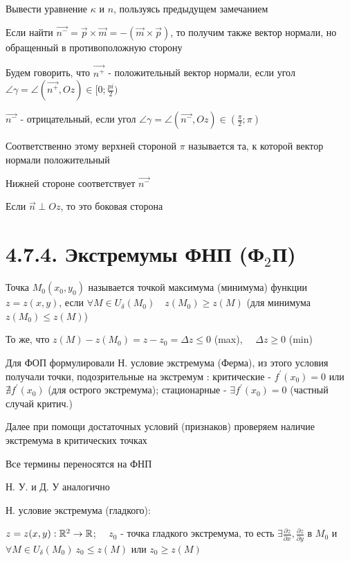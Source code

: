 \documentclass[12pt]{article}
\begin{document}
    \Lab Вывести уравнение $\kappa$ и $n$, пользуясь предыдущем замечанием

    \Nota Если найти $\overrightarrow{n^-} = \overrightarrow{p} \times \overrightarrow{m} = - (\overrightarrow{m} \times \overrightarrow{p})$, то получим также вектор нормали, но обращенный в противоположную сторону

    Будем говорить, что $\overrightarrow{n^+}$ - положительный вектор нормали, если угол $\angle\gamma = \angle (\overrightarrow{n^+}, Oz) \in [0; \frac{pi}{2})$

    $\overrightarrow{n^-}$ - отрицательный, если угол $\angle\gamma = \angle (\overrightarrow{n^-}, Oz) \in (\frac{\pi}{2}; \pi)$

    Соответственно этому верхней стороной $\pi$ называется та, к которой вектор нормали положительный

    Нижней стороне соответствует $\overrightarrow{n^-}$

    Если $\overrightarrow{n} \perp Oz$, то это боковая сторона

    \section{4.7.4. Экстремумы ФНП (Ф$_2$П)}

    \Def Точка $M_0(x_0, y_0)$ называется точкой максимума (минимума) функции $z = z(x, y)$, если $\forall M \in U_\delta (M_0) \quad z(M_0) \geq z(M)$ (для минимума $z(M_0) \leq z(M)$)

    \Nota То же, что $z(M) - z(M_0) = z - z_0 = \Delta z \leq 0$ (max), $\quad \Delta z \geq 0$ (min)

    \Mem Для ФОП формулировали Н. условие экстремума (Ферма), из этого условия получали точки, подозрительные на экстремум : критические - $f^\prime(x_0) = 0$ или $\nexists f^\prime(x_0)$ (для острого экстремума); стационарные - $\exists f^\prime(x_0) = 0$ (частный случай критич.)

    Далее при помощи достаточных условий (признаков) проверяем наличие экстремума в критических точках

    \Nota Все термины переносятся на ФНП

    Н. У. и Д. У аналогично

    \Th Н. условие экстремума (гладкого):

    $z = z(x, y) : \mathbb{R}^2 \rightarrow \mathbb{R}$; $\quad z_0$ - точка гладкого экстремума,
    то есть $\exists \frac{\partial z}{\partial x}, \frac{\partial z}{\partial y}$ в $M_0$ и $\forall M \in U_\delta(M_0) \ z_0 \leq z(M)$ или $z_0 \geq z(M)$
\end{document}
